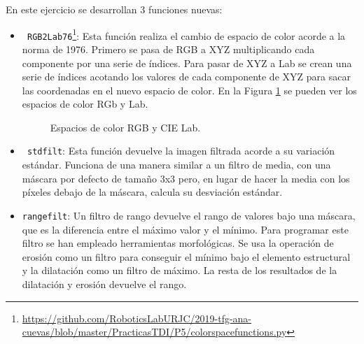 En este ejercicio se desarrollan 3 funciones nuevas:
\begin{itemize}

	\item \texttt{ RGB2Lab76}\footnote{\url{https://github.com/RoboticsLabURJC/2019-tfg-ana-cuevas/blob/master/PracticasTDI/P5/colorspacefunctions.py}}: Esta función realiza el cambio de espacio de color acorde a la norma de 1976. Primero se pasa de RGB a XYZ multiplicando cada componente por una serie de índices. Para pasar de XYZ a Lab se crean una serie de índices acotando los valores de cada componente de XYZ para sacar las coordenadas en el nuevo espacio de color. En la Figura \ref{colorspaces} se pueden ver los espacios de color RGb y Lab.
\begin{figure}[!tbp]
  \centering
  \hfill
  \caption{Espacios de color RGB y CIE Lab.}
  \label{colorspaces}
\end{figure}

	\item \texttt{ stdfilt}: Esta función devuelve la imagen filtrada acorde a su variación estándar. Funciona de una manera similar a un filtro de media, con una máscara por defecto de tamaño 3x3 pero, en lugar de hacer la media con los píxeles debajo de la máscara, calcula su desviación estándar.

	\item \texttt{rangefilt}: Un filtro de rango devuelve el rango de valores bajo una máscara, que es la diferencia entre el máximo valor y el mínimo. Para programar este filtro se han empleado herramientas morfológicas. Se usa la operación de erosión como un filtro para conseguir el mínimo bajo el elemento estructural y la dilatación como un filtro de máximo. La resta de los resultados de la dilatación y erosión devuelve el rango.\\
\end{itemize}

